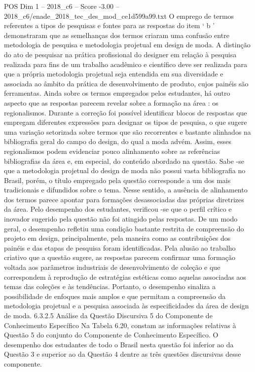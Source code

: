 \begin{textsample}{POS Dim 1 – 2018\_c6 – Score -3.00 – 2018\_c6/enade\_2018\_tec\_des\_mod\_ce1d599a99.txt}
O emprego de termos referentes a tipos de pesquisas e fontes para as respostas do item ‘ b ’ demonstraram que as semelhanças dos termos criaram uma confusão entre metodologia de pesquisa e metodologia projetual em design de moda.
A distinção do ato de pesquisar na prática profissional do designer em relação à pesquisa realizada para fins de um trabalho acadêmico e científico deve ser realizada para que a própria metodologia projetual seja entendida em sua diversidade e associada ao âmbito da prática de desenvolvimento de produto, cujos painéis são ferramentas.
Ainda sobre os termos empregados pelos estudantes, há outro aspecto que as respostas parecem revelar sobre a formação na área : os regionalismos.
Durante a correção foi possível identificar blocos de respostas que empregam diferentes expressões para designar os tipos de pesquisa, o que sugere uma variação setorizada sobre termos que são recorrentes e bastante alinhados na bibliografia geral do campo do design, do qual a moda advém.
Assim, esses regionalismos podem evidenciar pouco alinhamento sobre as referências bibliografias da área e, em especial, do conteúdo abordado na questão.
Sabe -se que a metodologia projetual do design de moda não possui vasta bibliografia no Brasil, porém, o título empregado pela questão corresponde a um dos mais tradicionais e difundidos sobre o tema.
Nesse sentido, a ausência de alinhamento dos termos parece apontar para formações desassociadas das próprias diretrizes da área.
Pelo desempenho dos estudantes, verificou -se que o perfil crítico e inovador sugerido pela questão não foi atingido pelas respostas.
De um modo geral, o desempenho refletiu uma condição bastante restrita de compreensão do projeto em design, principalmente, pela maneira como as contribuições dos painéis e das etapas de pesquisa foram identificadas.
Pela alusão ao trabalho criativo que a questão sugere, as respostas parecem confirmar uma formação voltada aos parâmetros industriais de desenvolvimento de coleção e que correspondem à reprodução de estratégias estéticas como aquelas associadas aos temas das coleções e às tendências.
Portanto, o desempenho sinaliza a possibilidade de enfoques mais amplos e que permitam a compreensão da metodologia projetual e a pesquisa associada às especificidades da área de design de moda. 6.3.2.5 Análise da Questão Discursiva 5 do Componente de Conhecimento Específico Na Tabela 6.20, constam as informações relativas à Questão 5 do conjunto do Componente de Conhecimento Específico.
O desempenho dos estudantes de todo o Brasil nesta questão foi inferior ao da Questão 3 e superior ao da Questão 4 dentre as três questões discursivas desse componente.

\end{textsample}
